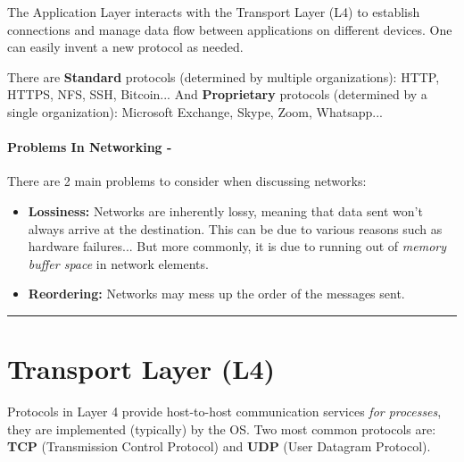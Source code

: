 \documentclass[openany,12pt]{book}
\begin{document}
The Application Layer interacts with the Transport Layer (L4) to establish connections and manage data flow between applications on different devices. One can easily invent a new protocol as needed.

There are \textbf{Standard} protocols (determined by multiple organizations): HTTP, HTTPS, NFS, SSH, Bitcoin...
And \textbf{Proprietary} protocols (determined by a single organization): Microsoft Exchange, Skype, Zoom, Whatsapp...

\paragraph{Problems In Networking - } There are 2 main problems to consider when discussing networks:
\begin{itemize}
  \item \textbf{Lossiness:} Networks are inherently lossy, meaning that data sent won't always arrive at the destination. This can be due to various reasons such as hardware failures... But more commonly, it is due to running out of \textit{memory buffer space} in network elements.
  \item \textbf{Reordering:} Networks may mess up the order of the messages sent.
\end{itemize}





\noindent\rule{\linewidth}{0.5pt}


\section*{Transport Layer (L4)}

Protocols in Layer 4 provide host-to-host communication services \textit{for processes}, they are implemented (typically) by the OS. Two most common protocols are: \textbf{TCP} (Transmission Control Protocol) and \textbf{UDP} (User Datagram Protocol).
\end{document}
